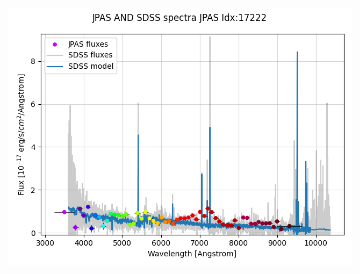 \documentclass{beamer}
\begin{document}
\begin{frame}
\begin{figure}
\begin{subfigure}{0.3\linewidth}
            \includegraphics[width=1.0\textwidth]{../../figs/spec/jpas_sdss_17222.png}
        \end{subfigure}

    \end{figure}
\end{frame}
\end{document}
